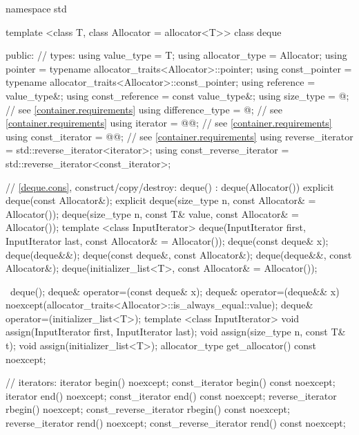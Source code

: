 \begin{codeblock}
namespace std {
  template <class T, class Allocator = allocator<T>>
  class deque {
  public:
    // types:
    using value_type             = T;
    using allocator_type         = Allocator;
    using pointer                = typename allocator_traits<Allocator>::pointer;
    using const_pointer          = typename allocator_traits<Allocator>::const_pointer;
    using reference              = value_type&;
    using const_reference        = const value_type&;
    using size_type              = @\impdef@; // see \ref{container.requirements}
    using difference_type        = @\impdef@; // see \ref{container.requirements}
    using iterator               = @@; // see \ref{container.requirements}
    using const_iterator         = @@; // see \ref{container.requirements}
    using reverse_iterator       = std::reverse_iterator<iterator>;
    using const_reverse_iterator = std::reverse_iterator<const_iterator>;

    // \ref{deque.cons}, construct/copy/destroy:
    deque() : deque(Allocator()) { }
    explicit deque(const Allocator&);
    explicit deque(size_type n, const Allocator& = Allocator());
    deque(size_type n, const T& value, const Allocator& = Allocator());
    template <class InputIterator>
      deque(InputIterator first, InputIterator last, const Allocator& = Allocator());
    deque(const deque& x);
    deque(deque&&);
    deque(const deque&, const Allocator&);
    deque(deque&&, const Allocator&);
    deque(initializer_list<T>, const Allocator& = Allocator());

    ~deque();
    deque& operator=(const deque& x);
    deque& operator=(deque&& x)
      noexcept(allocator_traits<Allocator>::is_always_equal::value);
    deque& operator=(initializer_list<T>);
    template <class InputIterator>
      void assign(InputIterator first, InputIterator last);
    void assign(size_type n, const T& t);
    void assign(initializer_list<T>);
    allocator_type get_allocator() const noexcept;

    // iterators:
    iterator               begin() noexcept;
    const_iterator         begin() const noexcept;
    iterator               end() noexcept;
    const_iterator         end() const noexcept;
    reverse_iterator       rbegin() noexcept;
    const_reverse_iterator rbegin() const noexcept;
    reverse_iterator       rend() noexcept;
    const_reverse_iterator rend() const noexcept;

}}
\end{codeblock}

